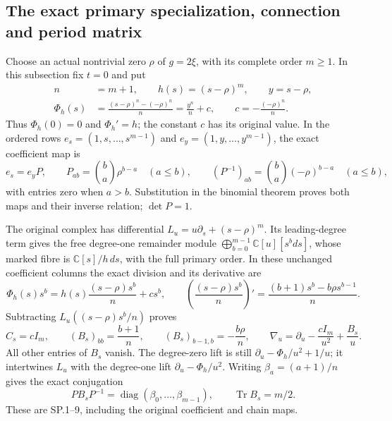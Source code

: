 \subsection{The exact primary specialization, connection and period matrix}

Choose an actual nontrivial zero \(\rho\) of \(g=2\xi\), with its
complete order \(m\geq1\).  In this subsection fix \(t=0\) and put
\[
 \begin{aligned}
 n&=m+1,\qquad h(s)=(s-\rho)^m,\qquad
 y=s-\rho,\\
 \Phi_h(s)&=\frac{(s-\rho)^n-(-\rho)^n}{n}
          =\frac{y^n}{n}+c,\qquad
 c=-\frac{(-\rho)^n}{n}.
 \end{aligned}
\]
Thus \(\Phi_h(0)=0\) and \(\Phi_h'=h\); the constant \(c\) has its
original value.  In the ordered rows
\(e_s=(1,s,\ldots,s^{m-1})\) and
\(e_y=(1,y,\ldots,y^{m-1})\), the exact coefficient map is
\[
 e_s=e_yP,\qquad
 P_{ab}=\binom ba\rho^{b-a}\quad(a\leq b),\qquad
 (P^{-1})_{ab}=\binom ba(-\rho)^{b-a}\quad(a\leq b),
\]
with entries zero when \(a>b\).  Substitution in the binomial theorem
proves both maps and their inverse relation; \(\det P=1\).

The original complex has differential
\(L_u=u\partial_s+(s-\rho)^m\).
Its leading-degree term gives the free degree-one remainder module
\(\bigoplus_{b=0}^{m-1}\mathbb C[u][s^bds]\), whose marked fibre is
\(\mathbb C[s]/h\,ds\), with the full primary order.  In these unchanged
coefficient columns the exact division and its derivative are
\[
 \Phi_h(s)s^b
   =h(s)\frac{(s-\rho)s^b}{n}+cs^b,\qquad
 \left(\frac{(s-\rho)s^b}{n}\right)'
   =\frac{(b+1)s^b-b\rho s^{b-1}}n .
\]
Subtracting \(L_u((s-\rho)s^b/n)\) proves
\[
 C_s=cI_m,\qquad
 (B_s)_{bb}=\frac{b+1}{n},\qquad
 (B_s)_{b-1,b}=-\frac{b\rho}{n},\qquad
 \nabla_u=\partial_u-\frac{cI_m}{u^2}+\frac{B_s}{u}.
\]
All other entries of \(B_s\) vanish.  The degree-zero lift is still
\(\partial_u-\Phi_h/u^2+1/u\); it intertwines \(L_u\) with the
degree-one lift \(\partial_u-\Phi_h/u^2\).  Writing
\(\beta_a=(a+1)/n\) gives the exact conjugation
\[
 PB_sP^{-1}=\operatorname{diag}(\beta_0,\ldots,\beta_{m-1}),
 \qquad \operatorname{Tr}B_s=m/2.
\]
These are SP.1--9, including the original coefficient and chain maps.

